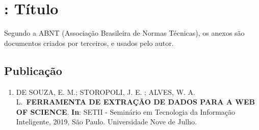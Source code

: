 \section{: Título}
    Segundo a ABNT (Associação Brasileira de Normas Técnicas), os anexos são documentos criados por terceiros, e usados pelo autor.
    \subsection*{Publicação}
        \begin{enumerate}
            \item DE SOUZA, E. M.; STOROPOLI, J. E. ; ALVES, W. A. L.~\textbf{FERRAMENTA DE EXTRAÇÃO DE DADOS PARA A WEB OF SCIENCE}. \textbf{In}: SETII - Seminário em Tecnologia da Informação Inteligente, 2019, São Paulo. Universidade Nove de Julho.
        \end{enumerate}